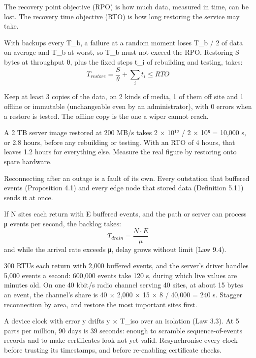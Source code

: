  The recovery point objective (RPO) is how much data, measured in time, can be lost. The recovery time objective (RTO) is how long restoring the service may take.

 With backups every T\_b, a failure at a random moment loses T\_b / 2 of data on average and T\_b at worst, so T\_b must not exceed the RPO. Restoring S bytes at throughput θ, plus the fixed steps t\_i of rebuilding and testing, takes:
\[ T_{restore} = \frac{S}{\theta} + \sum_i t_i \le RTO \]

 Keep at least 3 copies of the data, on 2 kinds of media, 1 of them off site and 1 offline or immutable (unchangeable even by an administrator), with 0 errors when a restore is tested. The offline copy is the one a wiper cannot reach.

 A 2 TB server image restored at 200 MB/s takes 2 × 10¹² / 2 × 10⁸ = 10,000 s, or 2.8 hours, before any rebuilding or testing. With an RTO of 4 hours, that leaves 1.2 hours for everything else. Measure the real figure by restoring onto spare hardware.

Reconnecting after an outage is a fault of its own. Every outstation that buffered events (Proposition 4.1) and every edge node that stored data (Definition 5.11) sends it at once.

 If N sites each return with E buffered events, and the path or server can process μ events per second, the backlog takes:
\[ T_{drain} = \frac{N \cdot E}{\mu} \]
and while the arrival rate exceeds μ, delay grows without limit (Law 9.4).

 300 RTUs each return with 2,000 buffered events, and the server's driver handles 5,000 events a second: 600,000 events take 120 s, during which live values are minutes old. On one 40 kbit/s radio channel serving 40 sites, at about 15 bytes an event, the channel's share is 40 × 2,000 × 15 × 8 / 40,000 = 240 s. Stagger reconnection by area, and restore the most important sites first.

 A device clock with error y drifts y × T\_iso over an isolation (Law 3.3). At 5 parts per million, 90 days is 39 seconds: enough to scramble sequence-of-events records and to make certificates look not yet valid. Resynchronise every clock before trusting its timestamps, and before re-enabling certificate checks.

